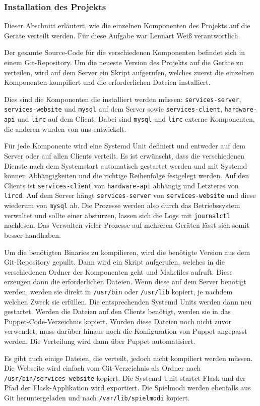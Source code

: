\subsubsection{Installation des Projekts}

Dieser Abschnitt erläutert, wie die einzelnen Komponenten des Projekts auf die Geräte verteilt
werden.
Für diese Aufgabe war Lennart Weiß verantwortlich.

Der gesamte Source-Code für die verschiedenen Komponenten befindet sich in einem Git-Repository.
Um die neueste Version des Projekts auf die Geräte zu verteilen, wird auf dem Server ein Skript
aufgerufen, welches zuerst die einzelnen Komponenten kompiliert und die erforderlichen Dateien
installiert.

Dies sind die Komponenten die installiert werden müssen: \texttt{services-server},
\texttt{services-website} und \texttt{mysql} auf dem Server sowie \texttt{services-client},
\texttt{hardware-api} und \texttt{lirc} auf dem Client.
Dabei sind \texttt{mysql} und \texttt{lirc} externe Komponenten, die anderen wurden von uns
entwickelt.

Für jede Komponente wird eine Systemd Unit definiert und entweder auf dem Server oder auf allen
Clients verteilt.
Es ist erwünscht, dass die verschiedenen Dienste nach dem Systemstart automatisch gestartet werden
und mit Systemd können Abhängigkeiten und die richtige Reihenfolge festgelegt werden.
Auf den Clients ist \texttt{services-client} von \texttt{hardware-api} abhängig und Letzteres von
\texttt{lircd}.
Auf dem Server hängt \texttt{services-server} von \texttt{services-website} und diese wiederum von
\texttt{mysql} ab.
Die Prozesse werden also durch das Betriebssystem verwaltet und sollte einer abstürzen, lassen sich
die Logs mit \texttt{journalctl} nachlesen.
Das Verwalten vieler Prozesse auf mehreren Geräten lässt sich somit besser handhaben.

Um die benötigten Binaries zu kompilieren, wird die benötigte Version aus dem Git-Repository
gepullt.
Dann wird ein Skript aufgerufen, welches in die verschiedenen Ordner der Komponenten geht und
Makefiles aufruft.
Diese erzeugen dann die erforderlichen Dateien.
Wenn diese auf dem Server benötigt werden, werden sie direkt in \texttt{/usr/bin} oder
\texttt{/usr/lib} kopiert, je nachdem welchen Zweck sie erfüllen.
Die entsprechenden Systemd Units werden dann neu gestartet.
Werden die Dateien auf den Clients benötigt, werden sie in das Puppet-Code-Verzeichnis kopiert.
Wurden diese Dateien noch nicht zuvor verwendet, muss darüber hinaus noch die Konfiguration von
Puppet angepasst werden.
Die Verteilung wird dann über Puppet automatisiert.

Es gibt auch einige Dateien, die verteilt, jedoch nicht kompiliert werden müssen.
Die Webseite wird einfach vom Git-Verzeichnis als Ordner nach \texttt{/usr/bin/services-website}
kopiert.
Die Systemd Unit startet Flask und der Pfad der Flask-Applikation wird exportiert.
Die Spielmodi werden ebenfalls aus Git heruntergeladen und nach \texttt{/var/lib/spielmodi} kopiert.
